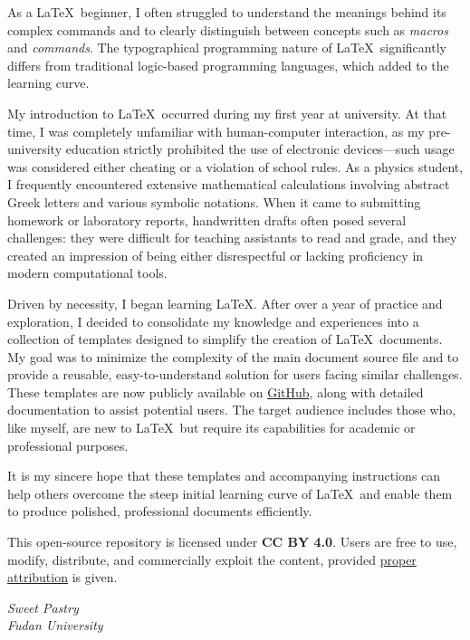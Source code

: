     As a \LaTeX\ beginner, I often struggled to understand the meanings behind its complex commands and to clearly distinguish between concepts such as \emph{macros} and \emph{commands}. The typographical programming nature of \LaTeX\ significantly differs from traditional logic-based programming languages, which added to the learning curve.

    My introduction to \LaTeX\ occurred during my first year at university. At that time, I was completely unfamiliar with human-computer interaction, as my pre-university education strictly prohibited the use of electronic devices—such usage was considered either cheating or a violation of school rules. As a physics student, I frequently encountered extensive mathematical calculations involving abstract Greek letters and various symbolic notations. When it came to submitting homework or laboratory reports, handwritten drafts often posed several challenges: they were difficult for teaching assistants to read and grade, and they created an impression of being either disrespectful or lacking proficiency in modern computational tools.

    Driven by necessity, I began learning \LaTeX. After over a year of practice and exploration, I decided to consolidate my knowledge and experiences into a collection of templates designed to simplify the creation of \LaTeX\ documents. My goal was to minimize the complexity of the main document source file and to provide a reusable, easy-to-understand solution for users facing similar challenges. These templates are now publicly available on \href{https://github.com/SweetPastry/spTemplate?tab=CC-BY-4.0-1-ov-file}{GitHub}, along with detailed documentation to assist potential users. The target audience includes those who, like myself, are new to \LaTeX\ but require its capabilities for academic or professional purposes.

    It is my sincere hope that these templates and accompanying instructions can help others overcome the steep initial learning curve of \LaTeX\ and enable them to produce polished, professional documents efficiently.
    
    This open-source repository is licensed under \textbf{CC BY 4.0}. Users are free to use, modify, distribute, and commercially exploit the content, provided \href{https://github.com/SweetPastry/spTemplate/blob/main/LICENSE}{proper attribution} is given.

    \begin{flushright}
        \textit{Sweet Pastry} \\[1em]
        \textit{Fudan University}
    \end{flushright}